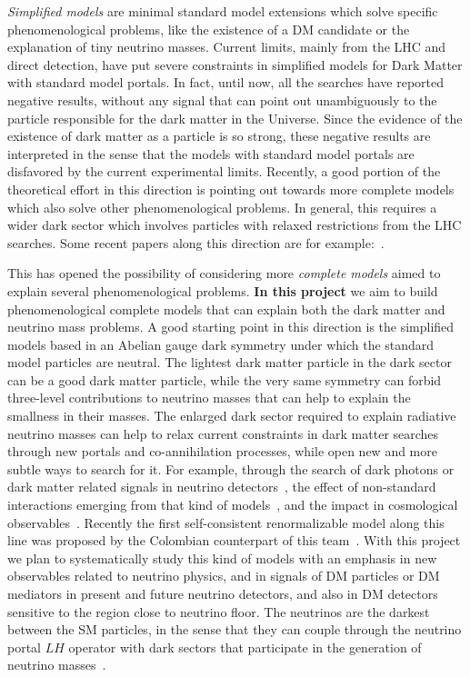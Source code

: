 \documentclass[a4paper,10pt,epsfig,epsf,amsfonts,amsmath]{article}
\begin{document}
\begin{ideas}
\textit{Simplified models} are minimal standard model extensions which
solve specific phenomenological problems, like the existence of a DM candidate or 
the explanation of tiny neutrino masses.
Current limits, mainly from
the LHC and direct detection, have put severe constraints in simplified
models for Dark Matter with standard model portals. 
In fact, until now, all the searches have reported negative results, without
any signal that can point out unambiguously to the particle 
responsible for the dark matter in the Universe.
Since the evidence of the existence of dark matter as a particle is so strong, 
these negative results are interpreted in the sense that
the models with standard model portals are disfavored by the current experimental limits.
Recently, a good portion of the theoretical effort in this direction
is pointing out towards more complete models which also solve 
other phenomenological problems. 
In general, this requires a wider dark sector which involves
particles with relaxed restrictions from the LHC searches.
Some recent papers along this direction are for
example:~\cite{Restrepo:2019soi,Ghiglieri:2019kbw,Ahmed:2019zxm}.


This has opened the possibility of considering more
\emph{complete models} aimed to explain several phenomenological problems.
{\bf In this project} we aim to build  phenomenological complete
models that can explain both the dark matter and neutrino mass problems.
A good starting point in this direction is the simplified models
based in an Abelian gauge dark symmetry under which the standard model
particles are neutral.  The lightest dark matter particle in the dark
sector can be a good dark matter particle, while the very same
symmetry can forbid three-level contributions to neutrino masses that
can help to explain the smallness in their masses. The enlarged dark
sector required to explain radiative neutrino masses can help to relax
current constraints in dark matter searches through new portals and
co-annihilation processes, while open new and more subtle ways to
search for it.
For example, through the search of dark photons or dark matter related
signals in neutrino detectors~\cite{Bertuzzo:2018itn,Bertuzzo:2018ftf,Arguelles:2019xgp}, the effect of
non-standard interactions emerging from that kind of
models~\cite{Dev:2019anc}, and the impact in cosmological
observables~\cite{Abazajian:2019oqj}.
Recently the first self-consistent renormalizable model along this
line was proposed by the Colombian counterpart of this team~\cite{Calle:2019mxn}.
With this project we plan to systematically study this kind of models
with an emphasis in new observables related to neutrino physics, and
in signals of DM particles or DM mediators in present and future
neutrino detectors, and also in DM detectors sensitive to the region
close to neutrino floor.
The neutrinos are the darkest between the SM particles, in
the sense that they can couple through the neutrino portal $LH$
operator with dark sectors that participate in the generation of
neutrino masses~\cite{Schmaltz:2017oov}.
 


\end{ideas}
\end{document}
